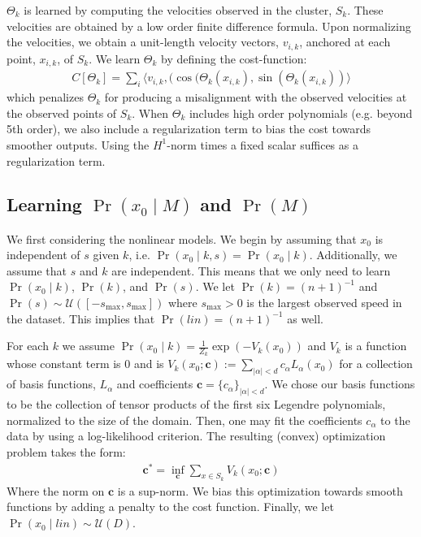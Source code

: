 \documentclass[letterpaper,10pt,conference]{ieeetran}
\begin{document}
 $\Theta_k$ is learned by computing the velocities observed in the cluster, $S_k$.
  These velocities are obtained by a low order finite difference formula.
  Upon normalizing the velocities, we obtain a unit-length velocity vectors, $v_{i,k}$, anchored at each point, $x_{i,k}$, of $S_k$.
  We learn $\Theta_k$ by defining the cost-function:
  \begin{align}
  	C[ \Theta_k] = \sum_i \langle v_{i,k} , ( \cos(\Theta_k( x_{i,k}) , \sin( \Theta_k( x_{i,k} ) ) \rangle
  \end{align}
  which penalizes $\Theta_k$ for producing a misalignment with the observed velocities at the observed points of $S_k$.
  When $\Theta_{k}$ includes high order polynomials (e.g. beyond 5th order), we also include a regularization term to bias the cost towards smoother outputs.
  Using the $H^1$-norm times a fixed scalar suffices as a regularization term. 
  
  \subsection{Learning $\Pr( x_0 \mid M)$ and $\Pr(M)$}
  
We first considering the nonlinear models.
  We begin by assuming that $x_0$ is independent of $s$ given $k$, i.e. $\Pr( x_0 \mid k,s) = \Pr(x_0 \mid k)$.
  Additionally, we assume that $s$ and $k$ are independent.
  This means that we only need to learn $\Pr( x_0 \mid k)$, $\Pr(k)$, and $\Pr(s)$.
  We let $\Pr(k) = (n+1)^{-1}$ and $\Pr(s) \sim \mathcal{U}( [-s_{\max}, s_{\max} ] )$  where $s_{\max}>0$ is the largest observed speed in the dataset.  
  This implies that $\Pr(lin) = (n+1)^{-1}$ as well.
  
  For each $k$ we assume $\Pr( x_0 \mid k) = \frac{1}{Z_k} \exp( - V_k(x_0) )$ and $V_k$ is a function whose constant term is $0$ and is  $V_k(x_0; \mathbf{c} ) := \sum_{|\alpha|< d} c_{\alpha} L_{\alpha}( x_0)$ for a collection of basis functions, $L_{\alpha}$ and coefficients $\mathbf{c} = \{ c_{\alpha} \}_{|\alpha| < d}$.
  We chose our basis functions to be the collection of tensor products of the first six Legendre polynomials, normalized to the size of the domain.
  Then, one may fit the coefficients $c_{\alpha}$ to the data by using a log-likelihood criterion.
  The resulting (convex) optimization problem takes the form:
  \begin{align}
  	\mathbf{c}^* = \inf_{ \mathbf{c} } \sum_{x \in S_k} V_k( x_0; \mathbf{c})
  \end{align}
  Where the norm on $\mathbf{c}$ is a sup-norm.
  We bias this optimization towards smooth functions by adding a penalty to the cost function.
    Finally, we let $\Pr( x_0 \mid lin) \sim \mathcal{U}(D)$.
  
\end{document}
